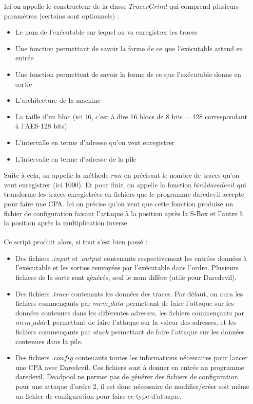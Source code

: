 \documentclass[10pt,a4paper]{article}
\begin{document}


Ici on appelle le constructeur de la classe $TracerGrind$ qui comprend plusieurs paramètres (certains sont optionnels) :
\begin{itemize}
\item Le nom de l'exécutable sur lequel on va enregistrer les traces
\item Une fonction permettant de savoir la forme de ce que l'exécutable attend en entrée
\item Une fonction permettent de savoir la forme de ce que l'exécutable donne en sortie
\item L'architecture de la machine
\item La taille d'un bloc (ici 16, c'est à dire 16 blocs de 8 bits = 128 correspondant à l'AES-128 bits)
\item L'intervalle en terme d'adresse qu'on veut enregistrer
\item L'intervalle en terme d'adresse de la pile
\end{itemize}
Suite à cela, on appelle la méthode $run$ en précisant le nombre de traces qu'on veut enregistrer (ici 1000). Et pour finir, on appelle la fonction $bin2daredevil$ qui transforme les traces enregistrées en fichiers que le programme daredevil accepte pour faire une CPA. Ici on précise qu'on veut que cette fonction produise un fichier de configuration faisant l'attaque à la position après la S-Box et l'autre à la position après la multiplication inverse.\\\\
Ce script produit alors, si tout s'est bien passé :
\begin{itemize}
\item Des fichiers $.input$ et $.output$ contenants respectivement les entrées données à l'exécutable et les sorties renvoyées par l'exécutable dans l'ordre. Plusieurs fichiers de la sorte sont générés, seul le nom diffère (utile pour Daredevil).
\item Des fichiers $.trace$ contenants les données des traces. Par défaut, on aura les fichiers commençants par $mem\_data$ permettant de faire l'attaque sur les données contenues dans les différentes adresses, les fichiers commençants par $mem\_addr1$ permettant de faire l'attaque sur la valeur des adresses, et les fichiers commençants par $stack$ permettant de faire l'attaque sur les données contenues dans la pile.
\item Des fichiers $.config$ contenants toutes les informations nécessaires pour lancer une CPA avec Daredevil. Ces fichiers sont à donner en entrée au programme daredevil. Deadpool ne permet pas de générer des fichiers de configuration pour une attaque d'ordre 2, il est donc nécessaire de modifier/créer soit même un fichier de configuration pour faire ce type d'attaque.
\end{itemize}
\end{document}
